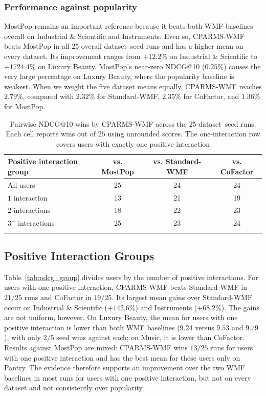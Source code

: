 \documentclass[pdflatex,sn-vancouver-num]{sn-jnl}%
\theoremstyle{thmstyleone}%
\theoremstyle{thmstyletwo}%
\theoremstyle{thmstylethree}%
\begin{document}
\subsubsection{Performance against popularity}

MostPop remains an important reference because it beats both WMF baselines overall on Industrial \& Scientific and Instruments. Even so, CPARMS-WMF beats MostPop in all $25$ overall dataset--seed runs and has a higher mean on every dataset. Its improvement ranges from $+12.2\%$ on Industrial \& Scientific to $+1724.4\%$ on Luxury Beauty. MostPop's near-zero NDCG@10 ($0.25\%$) causes the very large percentage on Luxury Beauty, where the popularity baseline is weakest. When we weight the five dataset means equally, CPARMS-WMF reaches $2.79\%$, compared with $2.32\%$ for Standard-WMF, $2.35\%$ for CoFactor, and $1.36\%$ for MostPop.

\begin{table}[!ht]
\caption{Pairwise NDCG@10 wins by CPARMS-WMF across the $25$ dataset--seed runs. Each cell reports wins out of $25$ using unrounded scores. The one-interaction row covers users with exactly one positive interaction}
\label{tab:pairwise_seed_wins}
\centering
\begin{tabular}{lccc}
\toprule
Positive interaction group & vs. MostPop & vs. Standard-WMF & vs. CoFactor \\
\midrule
All users & 25 & 24 & 24 \\
$1$ interaction & 13 & 21 & 19 \\
$2$ interactions & 18 & 22 & 23 \\
$3^{+}$ interactions & 25 & 23 & 24 \\
\botrule
\end{tabular}
\end{table}

\subsection{Positive Interaction Groups}

Table~\ref{tab:ndcg_group} divides users by the number of positive interactions. For users with one positive interaction, CPARMS-WMF beats Standard-WMF in $21/25$ runs and CoFactor in $19/25$. Its largest mean gains over Standard-WMF occur on Industrial \& Scientific ($+142.6\%$) and Instruments ($+68.2\%$). The gains are not uniform, however. On Luxury Beauty, the mean for users with one positive interaction is lower than both WMF baselines ($9.24$ versus $9.53$ and $9.79$), with only $2/5$ seed wins against each; on Music, it is lower than CoFactor. Results against MostPop are mixed: CPARMS-WMF wins $13/25$ runs for users with one positive interaction and has the best mean for these users only on Pantry. The evidence therefore supports an improvement over the two WMF baselines in most runs for users with one positive interaction, but not on every dataset and not consistently over popularity.
\end{document}
